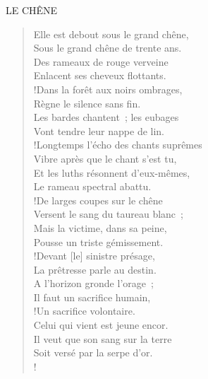 \documentclass[french,twoside]{book} %
\newcommand{\astertri}{\medskip\par\centerline{\color{rubric}\large\selectfont{\syms ✻\,✻\,✻}}\medskip\par}%
\newcommand\corr[1]{#1}
\newenvironment{quoteblock}%
  {\begin{quoting}}
  {\end{quoting}}
\newenvironment{quotebar}{%
    \def\FrameCommand{{\color{rubric!10!}\vrule width 0.5em} \hspace{0.9em}}%
    \def\OuterFrameSep{\itemsep} %
    \MakeFramed {\advance\hsize-\width \FrameRestore}
  }%
  {%
    \endMakeFramed
  }
\renewenvironment{quoteblock}%
  {%
    \savenotes
    \setstretch{0.9}
    \normalfont
    \begin{quotebar}
  }
  {%
    \end{quotebar}
    \spewnotes
  }
\begin{document}
\begin{quoteblock}
LE CHÊNE
\astertri

\end{quoteblock}

\begin{verse}
Elle est debout sous le grand chêne,\\
Sous le grand chêne de trente ans.\\
Des rameaux de rouge verveine\\
Enlacent ses cheveux flottants.\\!Dans la forêt aux noirs ombrages,\\
Règne le silence sans fin.\\
Les bardes chantent ; les eubages\\
Vont tendre leur nappe de lin.\\!Longtemps l’écho des chants suprêmes\\
Vibre après que le chant s’est tu,\\
Et les luths résonnent d’eux-mêmes,\\
Le rameau spectral abattu.\\!De larges coupes sur le chêne\\
Versent le sang du taureau blanc ;\\
Mais la victime, dans sa peine,\\
Pousse un triste gémissement.\\!Devant [{\corr le}] sinistre présage,\\
La prêtresse parle au destin.\\
A l’horizon gronde l’orage ;\\
Il faut un sacrifice humain,\\!Un sacrifice volontaire.\\
Celui qui vient est jeune encor.\\
Il veut que son sang sur la terre\\
Soit versé par la serpe d’or.\\!
\end{verse}
\begin{quoteblock}
 \end{quoteblock}
\end{document}
